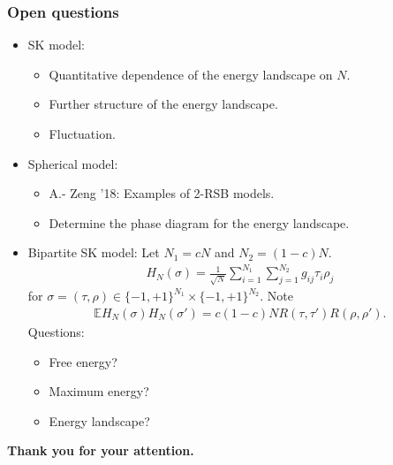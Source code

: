 \documentclass[handout]{beamer}
\newcommand{\e}{\mathbb{E}}
\begin{document}
\begin{frame}\frametitle{Open questions}
	
	    \pause
	    
	\begin{itemize}
		\item SK model:
	    \begin{itemize}
                    \item[-] Quantitative dependence of the energy landscape on $N.$
                    \item[-] Further structure of the energy landscape.
   		        	\item[-] Fluctuation.
		\end{itemize}
		
		\pause
		
		\item Spherical model:
		 \begin{itemize}
                    \item[-]  A.- Zeng '18: Examples of 2-RSB models. 
                    \item[-]  Determine the phase diagram for the energy landscape.
		\end{itemize}
		
		\item Bipartite SK model: Let $N_1=cN$ and $N_2=(1-c)N.$
		{\footnotesize\begin{align*}
		H_N(\sigma)=\frac{1}{\sqrt{N}}\sum_{i=1}^{N_1}\sum_{j=1}^{N_2}g_{ij}\tau_i\rho_j
		\end{align*}}
		for  $\sigma=(\tau,\rho)\in \{-1,+1\}^{N_1}\times \{-1,+1\}^{N_2}.$ Note
		{\footnotesize\begin{align*}
		\e H_N(\sigma)H_N(\sigma')=c(1-c)NR(\tau,\tau')R(\rho,\rho').
		\end{align*}}
		Questions:
		\begin{itemize}
			\item[-] Free energy?
			\item[-] Maximum energy?
			\item[-] Energy landscape?
		\end{itemize}
	
		
		\end{itemize}
	
	\end{frame}
     

\begin{frame}
	\begin{center}
		\Large \bf Thank you for your attention.
	\end{center}
\end{frame}
\end{document}
